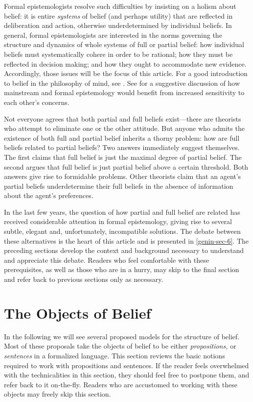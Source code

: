 Formal epistemologists resolve such difficulties by insisting on a holism about
belief: it is entire {\em systems} of belief (and perhaps utility) that are
reflected in deliberation and action, otherwise underdetermined by individual
beliefs. In general, formal epistemologists are interested in the norms
governing the structure and dynamics of whole systems of full or partial belief:
how individual beliefs must systematically cohere in order to be rational; how
they must be reflected in decision making; and how they ought to accommodate new
evidence. Accordingly, those issues will be the focus of this article. For a
good introduction to belief in the philosophy of mind, see \citet{sep-belief}.
See \citet{hajek2017tale} for a suggestive discussion of how mainstream and
formal epistemology would benefit from increased sensitivity to each other's
concerns.

Not everyone agrees that both partial and full beliefs exist---there are
theorists who attempt to eliminate one or the other attitude. But anyone who
admits the existence of both full and partial belief inherits a thorny problem:
how are full beliefs related to partial beliefs? Two  answers immediately
suggest themselves. The first claims that full belief is just the maximal degree
of partial belief. The second argues that full belief is just partial belief
above a certain threshold. Both answers give rise to formidable problems. Other
theorists claim that an agent's partial beliefs underdetermine their full
beliefs in the absence of information about the agent's preferences.

In the last few years, the question of how partial and full belief are related
has received considerable attention in formal epistemology, giving rise to
several subtle, elegant and, unfortunately, incompatible solutions. The debate
between these alternatives is the heart of this article and is presented in
\autoref{genin-sec-6}. The preceding sections develop the context and background
necessary to understand and appreciate this debate. Readers who feel comfortable
with these prerequisites, as well as those who are in a hurry, may skip to the
final section and refer back to previous sections only as necessary.

\section{The Objects of Belief} \label{objects}
In the following we will see several proposed models for the structure of
belief. Most of these proposals take the objects of belief to be either {\em
propositions,} or {\em sentences} in a formalized language. This section reviews
the basic notions required to work with propositions and sentences. If the
reader feels overwhelmed with the technicalities in this section, they should
feel free to postpone them, and refer back to it on-the-fly. Readers who are
accustomed to working with these objects may freely skip this section.

